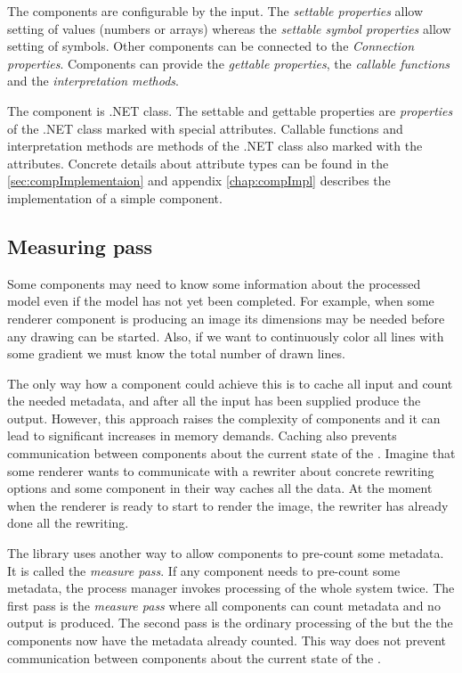 The components are configurable by the input.
The \emph{settable properties} allow setting of values (numbers or arrays) whereas the \emph{settable symbol properties} allow setting of \lsystem symbols.
Other components can be connected to the \emph{Connection properties}.
Components can provide the \emph{gettable properties}, the \emph{callable functions} and the \emph{interpretation methods}.

The component is .NET class.
The settable and gettable properties are \emph{properties} of the .NET class marked with special attributes.
Callable functions and interpretation methods are methods of the .NET class also marked with the attributes.
Concrete details about attribute types can be found in the \autoref{sec:compImplementaion} and appendix \ref{chap:compImpl} describes the implementation of a simple component.


\subsection{Measuring pass}
\label{sec:measuring}

Some components may need to know some information about the processed model even if the model has not yet been completed.
For example, when some renderer component is producing an image its dimensions may be needed before any drawing can be started.
Also, if we want to continuously color all lines with some gradient we must know the total number of drawn lines.

The only way how a component could achieve this is to cache all input and count the needed metadata, and after all the input has been supplied produce the output.
However, this approach raises the complexity of components and it can lead to significant increases in memory demands.
Caching also prevents communication between components about the current state of the \lsystem.
Imagine that some renderer wants to communicate with a rewriter about concrete rewriting options and some component in their way caches all the data.
At the moment when the renderer is ready to start to render the image, the rewriter has already done all the rewriting.

The library uses another way to allow components to pre-count some metadata.
It is called the \emph{measure pass}.
If any component needs to pre-count some metadata, the process manager invokes processing of the whole system twice.
The first pass is the \emph{measure pass} where all components can count metadata and no output is produced.
The second pass is the ordinary processing of the \lsystem but the the components now have the metadata already counted.
This way does not prevent communication between components about the current state of the \lsystem.

